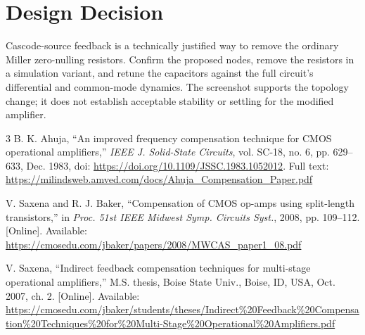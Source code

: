 \documentclass[10pt,journal]{IEEEtran}
\begin{document}
\section{Design Decision}
Cascode-source feedback is a technically justified way to remove the ordinary Miller zero-nulling resistors. Confirm the proposed nodes, remove the resistors in a simulation variant, and retune the capacitors against the full circuit's differential and common-mode dynamics. The screenshot supports the topology change; it does not establish acceptable stability or settling for the modified amplifier.

\begin{thebibliography}{3}
B. K. Ahuja, ``An improved frequency compensation technique for CMOS operational amplifiers,'' \emph{IEEE J. Solid-State Circuits}, vol. SC-18, no. 6, pp. 629--633, Dec. 1983, doi: \url{https://doi.org/10.1109/JSSC.1983.1052012}. Full text: \url{https://milindsweb.amved.com/docs/Ahuja_Compensation_Paper.pdf}

V. Saxena and R. J. Baker, ``Compensation of CMOS op-amps using split-length transistors,'' in \emph{Proc. 51st IEEE Midwest Symp. Circuits Syst.}, 2008, pp. 109--112. [Online]. Available: \url{https://cmosedu.com/jbaker/papers/2008/MWCAS_paper1_08.pdf}

V. Saxena, ``Indirect feedback compensation techniques for multi-stage operational amplifiers,'' M.S. thesis, Boise State Univ., Boise, ID, USA, Oct. 2007, ch. 2. [Online]. Available: \url{https://cmosedu.com/jbaker/students/theses/Indirect%20Feedback%20Compensation%20Techniques%20for%20Multi-Stage%20Operational%20Amplifiers.pdf}
\end{thebibliography}
\end{document}
